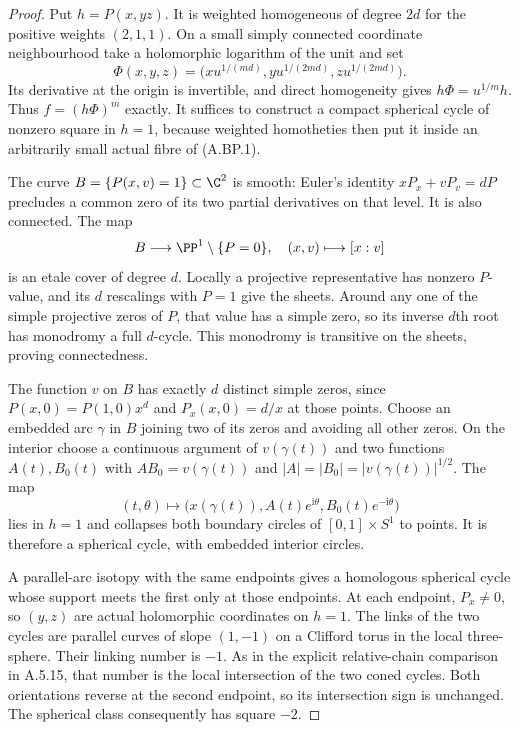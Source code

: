 \begin{proof}
Put $h=P(x,yz)$. It is weighted homogeneous of degree
$2d$ for the positive weights $(2,1,1)$.
On a small simply connected coordinate neighbourhood
take a holomorphic logarithm of the unit and set
\[
 \Phi(x,y,z)=\bigl(xu^{1/(md)},
                  yu^{1/(2md)},zu^{1/(2md)}\bigr).
                                                        \tag{A.BP.2}
\]
Its derivative at the origin is invertible, and direct
homogeneity gives $h\Phi=u^{1/m}h$. Thus
$f=(h\Phi)^m$ exactly. It suffices to construct a
compact spherical cycle of nonzero square in $h=1$,
because weighted homotheties then put it inside an
arbitrarily small actual fibre of (A.BP.1).

The curve $B=\{P(x,v)=1\}\subset\C^2$ is smooth:
Euler's identity $xP_x+vP_v=dP$ precludes a common
zero of its two partial derivatives on that level.
It is also connected. The map
\[
 B\longrightarrow\PP^1\setminus\{P=0\},
                       \quad(x,v)\longmapsto[x:v]
\]
is an etale cover of degree $d$. Locally a projective
representative has nonzero $P$-value, and its $d$
rescalings with $P=1$ give the sheets. Around any
one of the simple projective zeros of $P$, that
value has a simple zero, so its inverse $d$th root
has monodromy a full $d$-cycle. This monodromy is
transitive on the sheets, proving connectedness.

The function $v$ on $B$ has exactly $d$ distinct
simple zeros, since
$P(x,0)=P(1,0)x^d$ and $P_x(x,0)=d/x$ at those
points. Choose an embedded arc $\gamma$ in $B$
joining two of its zeros and avoiding all other
zeros. On the interior choose a continuous argument
of $v(\gamma(t))$ and two functions $A(t),B_0(t)$
with $A B_0=v(\gamma(t))$ and
$|A|=|B_0|=|v(\gamma(t))|^{1/2}$.
The map
\[
 (t,\theta)\longmapsto
   \bigl(x(\gamma(t)),A(t)e^{\mathrm i\theta},
                        B_0(t)e^{-\mathrm i\theta}\bigr)
                                                        \tag{A.BP.3}
\]
lies in $h=1$ and collapses both boundary circles
of $[0,1]\times S^1$ to points. It is therefore a
spherical cycle, with embedded interior circles.

A parallel-arc isotopy with the same endpoints gives
a homologous spherical cycle whose support meets
the first only at those endpoints. At each endpoint,
$P_x\ne0$, so $(y,z)$ are actual holomorphic
coordinates on $h=1$. The links of the two cycles
are parallel curves of slope $(1,-1)$ on a Clifford
torus in the local three-sphere. Their linking
number is $-1$. As in the explicit relative-chain
comparison in A.5.15, that number is the local
intersection of the two coned cycles. Both
orientations reverse at the second endpoint,
so its intersection sign is unchanged. The
spherical class consequently has square $-2$.


\end{proof}
